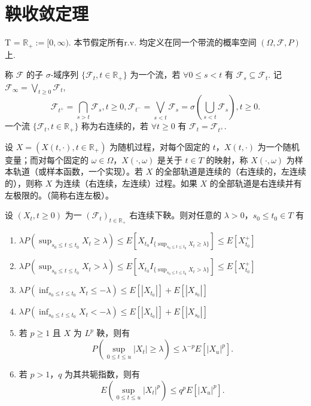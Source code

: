 \documentclass[lang=cn,10pt,thmcnt=section]{elegantbook}
\begin{document}
\section{鞅收敛定理}
T = $\mathbb{R}_+ := [0, \infty)$. 本节假定所有r.v. 均定义在同一个带流的概率空间 $(\Omega, \mathcal{F}, P)$ 上.
\begin{definition}
	称 $\mathcal{F}$ 的子 $\sigma$-域序列 $\{\mathcal{F}_t, t \in \mathbb{R}_+\}$ 为一个流，若 $\forall 0 \leq s < t$ 有 $\mathcal{F}_s \subseteq \mathcal{F}_t$. 记 $\mathcal{F}_\infty = \bigvee_{t \geq 0} \mathcal{F}_t$,
\[
\mathcal{F}_{t^+} = \bigcap_{s > t} \mathcal{F}_s, t \geq 0, \mathcal{F}_{t^-} = \bigvee_{s < t} \mathcal{F}_s = \sigma(\bigcup_{s < t} \mathcal{F}_s), t \geq 0.
\]
一个流 $\{\mathcal{F}_t, t \in \mathbb{R}_+\}$ 称为右连续的，若 $\forall t \geq 0$ 有 $\mathcal{F}_t = \mathcal{F}_{t^+}$.
\end{definition}
\begin{definition}
	设 $X = (X(t, \cdot), t \in \mathbb{R}_+)$ 为随机过程，对每个固定的 $t$，$X(t, \cdot)$ 为一个随机变量；而对每个固定的 $\omega \in \Omega$，$X(\cdot, \omega)$ 是关于 $t \in T$ 的映射，称 $X(\cdot, \omega)$ 为样本轨道（或样本函数，一个实现）。若 $X$ 的全部轨道是连续的（右连续的，左连续的），则称 $X$ 为连续（右连续，左连续）过程。如果 $X$ 的全部轨道是右连续并有左极限的。（简称右连左极）。
\end{definition}
\begin{theorem}
	设 $(X_t, t \geq 0)$ 为一 $(\mathcal{F}_t)_{t \in \mathbb{R}_+}$ 右连续下鞅。则对任意的 $\lambda > 0$，$s_0 \leq t_0 \in T$ 有
\begin{enumerate}
    \item $\lambda P(\sup_{s_0 \leq t \leq t_0} X_t \geq \lambda) \leq E[X_{t_0} I_{\{\sup_{s_0 \leq t \leq t_0} X_t \geq \lambda\}}] \leq E[X_{t_0}^+]$
    \item $\lambda P(\sup_{s_0 \leq t \leq t_0} X_t > \lambda) \leq E[X_{t_0} I_{\{\sup_{s_0 \leq t \leq t_0} X_t > \lambda\}}] \leq E[X_{t_0}^+]$
    \item $\lambda P(\inf_{s_0 \leq t \leq t_0} X_t \leq -\lambda) \leq E[|X_{t_0}|] + E[|X_{s_0}|]$
    \item $\lambda P(\inf_{s_0 \leq t \leq t_0} X_t < -\lambda) \leq E[|X_{t_0}|] + E[|X_{s_0}|]$
    \item 若 $p \geq 1$ 且 $X$ 为 $L^p$ 鞅，则有
    \[
    P(\sup_{0 \leq t \leq u} |X_t| \geq \lambda) \leq \lambda^{-p} E[|X_u|^p].
    \]
    \item 若 $p > 1$，$q$ 为其共轭指数，则有
    \[
    E(\sup_{0 \leq t \leq u} |X_t|^p) \leq q^p E[|X_u|^p].
    \]
\end{enumerate}
\end{theorem}
\end{document}
